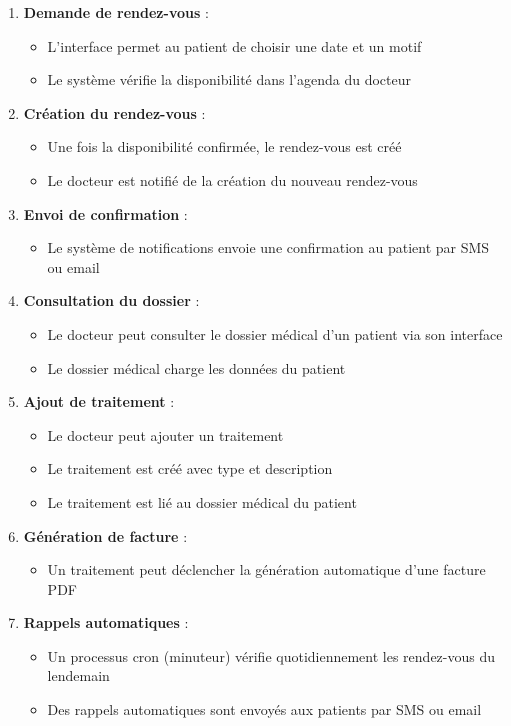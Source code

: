 \documentclass[12pt,a4paper]{report}
\begin{document}
\begin{enumerate}
    \item \textbf{Demande de rendez-vous} : 
    \begin{itemize}
        \item L'interface permet au patient de choisir une date et un motif
        \item Le système vérifie la disponibilité dans l'agenda du docteur
    \end{itemize}
    
    \item \textbf{Création du rendez-vous} : 
    \begin{itemize}
        \item Une fois la disponibilité confirmée, le rendez-vous est créé
        \item Le docteur est notifié de la création du nouveau rendez-vous
    \end{itemize}
    
    \item \textbf{Envoi de confirmation} : 
    \begin{itemize}
        \item Le système de notifications envoie une confirmation au patient par SMS ou email
    \end{itemize}
    
    \item \textbf{Consultation du dossier} : 
    \begin{itemize}
        \item Le docteur peut consulter le dossier médical d'un patient via son interface
        \item Le dossier médical charge les données du patient
    \end{itemize}
    
    \item \textbf{Ajout de traitement} : 
    \begin{itemize}
        \item Le docteur peut ajouter un traitement
        \item Le traitement est créé avec type et description
        \item Le traitement est lié au dossier médical du patient
    \end{itemize}
    
    \item \textbf{Génération de facture} : 
    \begin{itemize}
        \item Un traitement peut déclencher la génération automatique d'une facture PDF
    \end{itemize}
    
    \item \textbf{Rappels automatiques} : 
    \begin{itemize}
        \item Un processus cron (minuteur) vérifie quotidiennement les rendez-vous du lendemain
        \item Des rappels automatiques sont envoyés aux patients par SMS ou email
    \end{itemize}
\end{enumerate}
\end{document}
